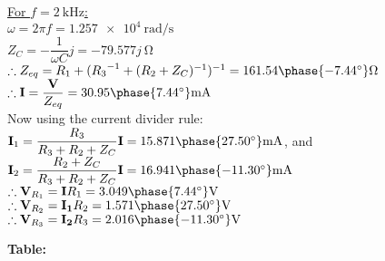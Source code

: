 \documentclass[12pt]{article}
\begin{document}
\begin{large}
{		%
		\vspace{20pt}
		\underline{For $ f = \SI{2}{\kilo\hertz} $:}\\
		$ \omega = 2 \pi f = \SI{1.257e4}{\radian\per\s} $\\
		$ Z_C = - \dfrac{1}{\omega C} j = -79.577 j \SI{}{\ohm} $\\
		$ \therefore Z_{eq} = R_1 + ({R_3}^{-1} + (R_2 + Z_C)^{-1})^{-1} = 161.54\phase{-7.44^\circ} \SI{}{\ohm} $\\
		$ \therefore \mathbf{I} = \dfrac{\mathbf{V}}{Z_{eq}} = 30.95\phase{7.44^\circ} \SI{}{\milli\A} $\\
		Now using the current divider rule:\\
		$ \mathbf{I}_1 = \dfrac{R_3}{R_3 + R_2 + Z_C} \mathbf{I} = 15.871\phase{27.50^\circ} \SI{}{\milli\A} $, and\\
		$ \mathbf{I}_2 = \dfrac{R_2 + Z_C}{R_3 + R_2 + Z_C} \mathbf{I} = 16.941\phase{-11.30^\circ} \SI{}{\milli\A} $\\
		$ \therefore \mathbf{V}_{R_1} = \mathbf{I} R_1 = 3.049\phase{7.44^\circ} \SI{}{\V} $\\
		$ \therefore \mathbf{V}_{R_2} = \mathbf{I_1} R_2 = 1.571\phase{27.50^\circ} \SI{}{\V} $\\
		$ \therefore \mathbf{V}_{R_3} = \mathbf{I_2} R_3 = 2.016\phase{-11.30^\circ} \SI{}{\V} $ \par}

	\vspace{20pt}
	\textbf{Table:}
	\begin{table}[H]
		\caption{Theoretical values}
		\label{tab:theoretical_values}
	\end{table}


\end{large}
\end{document}
